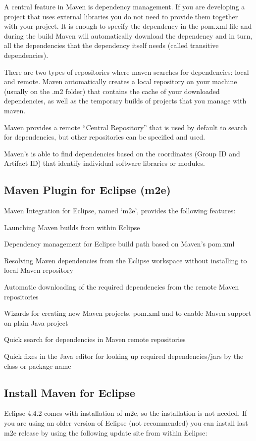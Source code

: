 \documentclass{article}
\begin{document}
A central feature in Maven is dependency management. If you are
developing a project that uses external libraries you do not need to
provide them together with your project. It is enough to specify the
dependency in the pom.xml file and  during the build Maven will
automatically download the dependency and in turn, all the
dependencies that the dependency itself needs (called transitive
dependencies).

There are two types of repositories where maven searches for
dependencies: local and remote. Maven automatically creates a local
repository on your machine (usually on the .m2 folder) that contains
the cache of your downloaded dependencies, as well as the
temporary builds of projects that you manage with maven.

Maven provides a remote ``Central Repository''  that is used by default to search
for dependencies, but other repositories can be specified and used.

Maven's is able to find dependencies based on the coordinates (Group
ID and Artifact ID) that identify individual software libraries or
modules.

\subsection{Maven Plugin for Eclipse (m2e)}

Maven Integration for Eclipse, named `m2e', provides the following features:
\begin{compactitem}
\item Launching Maven builds from within Eclipse
\item Dependency management for Eclipse build path based on Maven's pom.xml
\item Resolving Maven dependencies from the Eclipse workspace without installing to local Maven repository
\item Automatic downloading of the required dependencies from the remote Maven repositories
\item Wizards for creating new Maven projects, pom.xml and to enable Maven support on plain Java project
\item Quick search for dependencies in Maven remote repositories
\item Quick fixes in the Java editor for looking up required dependencies/jars by the class or package name
\end{compactitem}

\subsection{Install Maven for Eclipse}
Eclipse 4.4.2 comes with installation of m2e, so the installation is
not needed. If you are using an older version of Eclipse (not
recommended) you can install last m2e release by using the following
update site from within Eclipse: 
\end{document}
